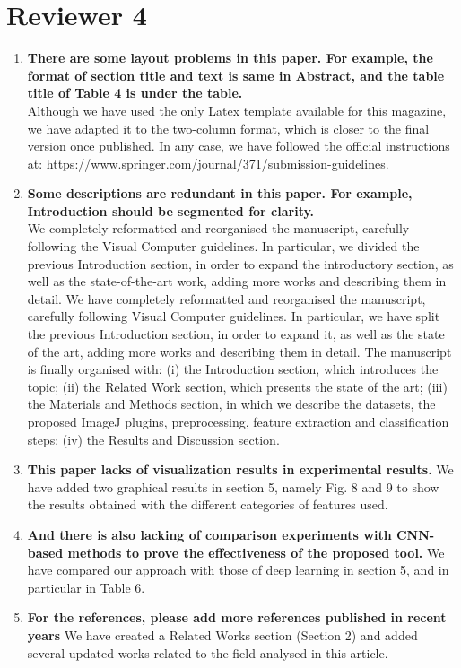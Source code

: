 \documentclass[]{article}
\begin{document}
	\section{Reviewer 4}
	
	\begin{enumerate}
	\item \textbf{There are some layout problems in this paper. For example, the format of section title and text is same in Abstract, and the table title of Table 4 is under the table.} \\
	Although we have used the only Latex template available for this magazine, we have adapted it to the two-column format, which is closer to the final version once published. In any case, we have followed the official instructions at: https://www.springer.com/journal/371/submission-guidelines.
	
	\item \textbf{Some descriptions are redundant in this paper. For example, Introduction should be segmented for clarity.} \\
	We completely reformatted and reorganised the manuscript, carefully following the Visual Computer guidelines. In particular, we divided the previous Introduction section, in order to expand the introductory section, as well as the state-of-the-art work, adding more works and describing them in detail. 
	We have completely reformatted and reorganised the manuscript, carefully following Visual Computer guidelines. In particular, we have split the previous Introduction section, in order to expand it, as well as the state of the art, adding more works and describing them in detail. 
	The manuscript is finally organised with: (i) the Introduction section, which introduces the topic; (ii) the Related Work section, which presents the state of the art; (iii) the Materials and Methods section, in which we describe the datasets, the proposed ImageJ plugins, preprocessing, feature extraction and classification steps; (iv) the Results and Discussion section.

	\item \textbf{This paper lacks of visualization results in experimental results.}
	We have added two graphical results in section 5, namely Fig. 8 and 9 to show the results obtained with the different categories of features used.

	\item \textbf{And there is also lacking of comparison experiments with CNN-based methods to prove the effectiveness of the proposed tool.}
	We have compared our approach with those of deep learning in section 5, and in particular in Table 6.
	
	\item \textbf{For the references, please add more references published in recent years}
	We have created a Related Works section (Section 2) and added several updated works related to the field analysed in this article.
	\end{enumerate}
	
\end{document}
